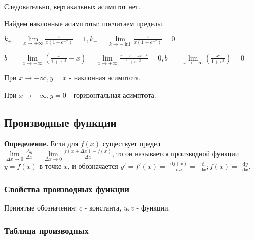 \documentclass{article}
\newcommand*\diff{\mathop{}\!\mathrm{d}}
\begin{document}
\begin{flushleft}
Следовательно, вертикальных асимптот нет.

\hfill 

Найдем наклонные асимптоты: посчитаем пределы.

$k_{+} = \lim\limits_{x \to +\infty} \frac{x}{x(1+e^{-x})} = 1, k_{-} = \lim\limits_{k \to -\inf} \frac{x}{x(1+e^{-x})} = 0$

$b_{+} = \lim\limits_{x \to +\infty} (\frac{x}{1+e^{-x}} - x) = \lim\limits_{x \to +\infty} \frac{x - x - x e^{-x}}{1 + e^{-x}} = 0, b_{-} = \lim\limits_{x \to -\infty} (\frac{x}{1 + e^x}) = 0$

\hfill

При $x \to +\infty, y = x$ - наклонная асимптота.

При $x \to -\infty, y = 0$ - горизонтальная асимптота.

\subsection{Производные функции}

\textbf{Определение.} Если для $f(x)$ существует предел $\lim\limits_{\Delta x \to 0} \frac{\Delta y}{\Delta x} = \lim\limits_{\Delta x \to 0} \frac{f(x + \Delta x) - f(x)}{\Delta x}$, то он называется производной функции $y = f(x)$ в точке $x$, и обозначается $y' = f'(x) = \frac{\diff f(x)}{\diff x} = \frac{\diff}{\diff x}; f(x) = \frac{\diff y}{\diff x}$.

\subsubsection{Свойства производных функции}

Принятые обозначения: $c$ - константа, $u, v$ - функции.

\begin{multienumerate}
\end{multienumerate}

\subsubsection{Таблица производных}


\end{flushleft}
\end{document}
